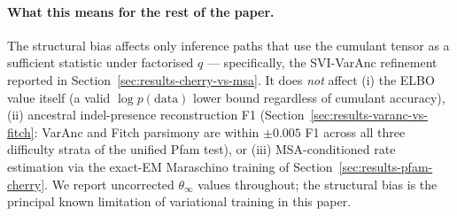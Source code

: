 \paragraph{What this means for the rest of the paper.}
The structural bias affects only inference paths that use the
cumulant tensor as a sufficient statistic under factorised $q$ ---
specifically, the SVI-VarAnc refinement reported in
Section~\ref{sec:results-cherry-vs-msa}.  It does \emph{not}
affect (i) the ELBO value itself (a valid $\log p(\text{data})$
lower bound regardless of cumulant accuracy), (ii) ancestral
indel-presence reconstruction F1
(Section~\ref{sec:results-varanc-vs-fitch}: VarAnc and Fitch
parsimony are within $\pm 0.005$ F1 across all three difficulty
strata of the unified Pfam test), or (iii) MSA-conditioned rate
estimation via the exact-EM Maraschino training of
Section~\ref{sec:results-pfam-cherry}.  We report uncorrected
$\theta_\infty$ values throughout; the structural bias is the
principal known limitation of variational training in this paper.
